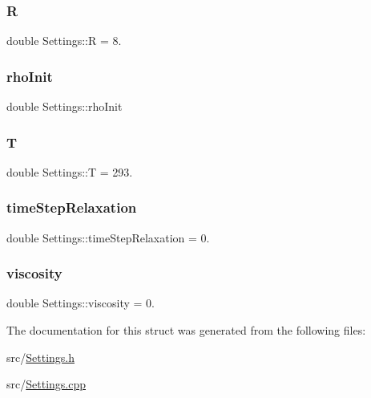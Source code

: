 \mbox{\label{structSettings_ad23422f52cc720203901b5d03605070b}} 
\subsubsection{\texorpdfstring{R}{R}}
{\footnotesize\ttfamily double Settings\+::R = 8.}

\mbox{\label{structSettings_aaf6b6f469c3ba50604e75845f1aa3b2a}} 
\subsubsection{\texorpdfstring{rhoInit}{rhoInit}}
{\footnotesize\ttfamily double Settings\+::rho\+Init}

\mbox{\label{structSettings_a255c7c5f048ccaeb00206462d3530240}} 
\subsubsection{\texorpdfstring{T}{T}}
{\footnotesize\ttfamily double Settings\+::T = 293.}

\mbox{\label{structSettings_ab186bb6f0f6ce1f234e5ab5a221c838d}} 
\subsubsection{\texorpdfstring{timeStepRelaxation}{timeStepRelaxation}}
{\footnotesize\ttfamily double Settings\+::time\+Step\+Relaxation = 0.}

\mbox{\label{structSettings_a96d99822c1bf7f6b025c93546c1c2a3a}} 
\subsubsection{\texorpdfstring{viscosity}{viscosity}}
{\footnotesize\ttfamily double Settings\+::viscosity = 0.}



The documentation for this struct was generated from the following files\+:\begin{DoxyCompactItemize}
\item 
src/\mbox{\hyperlink{Settings_8h}{Settings.\+h}}\item 
src/\mbox{\hyperlink{Settings_8cpp}{Settings.\+cpp}}\end{DoxyCompactItemize}
